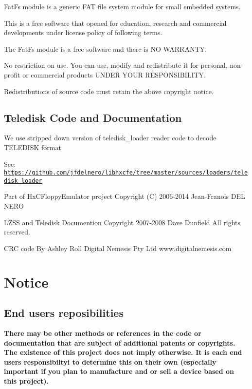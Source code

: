 Fat\+Fs module is a generic F\+AT file system module for small embedded systems.

This is a free software that opened for education, research and commercial developments under license policy of following terms.


\begin{DoxyItemize}
\item The Fat\+Fs module is a free software and there is NO W\+A\+R\+R\+A\+N\+TY.
\item No restriction on use. You can use, modify and redistribute it for personal, non-\/profit or commercial products U\+N\+D\+ER Y\+O\+UR R\+E\+S\+P\+O\+N\+S\+I\+B\+I\+L\+I\+TY.
\item Redistributions of source code must retain the above copyright notice.
\end{DoxyItemize}





\subsection*{Teledisk Code and Documentation}


\begin{DoxyItemize}
\item We use stripped down version of teledisk\+\_\+loader reader code to decode T\+E\+L\+E\+D\+I\+SK format
\begin{DoxyItemize}
\item See\+: \href{https://github.com/jfdelnero/libhxcfe/tree/master/sources/loaders/teledisk_loader}{\tt https\+://github.\+com/jfdelnero/libhxcfe/tree/master/sources/loaders/teledisk\+\_\+loader}
\begin{DoxyItemize}
\item Part of Hx\+C\+Floppy\+Emulator project Copyright (C) 2006-\/2014 Jean-\/\+Franois D\+EL N\+E\+RO
\item L\+Z\+SS and Teledisk Documention Copyright 2007-\/2008 Dave Dunfield All rights reserved.
\item C\+RC code By Ashley Roll Digital Nemesis Pty Ltd www.\+digitalnemesis.\+com 


\end{DoxyItemize}
\end{DoxyItemize}
\end{DoxyItemize}

\section*{Notice}

\subsection*{End users reposibilities}

{\bfseries There may be other methods or references in the code or documentation that are subject of additional patents or copyrights. The existence of this project does not imply otherwise. It is each end users responsibiltyi to determine this on their own (especially important if you plan to manufacture and or sell a device based on this project).} 